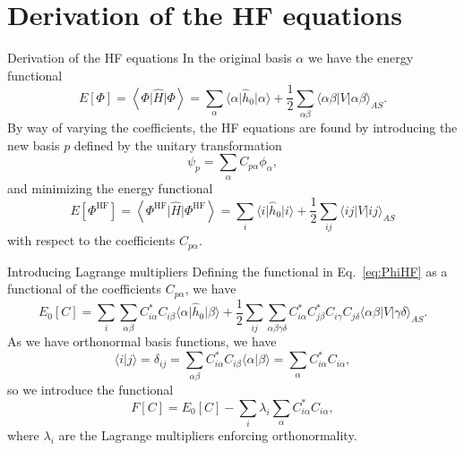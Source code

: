 \documentclass[UKenglish,aspectratio=169]{beamer}
\begin{document}

\appendix
\section{Derivation of the HF equations}

\begin{frame}{Derivation of the HF equations}
    In the original basis $\alpha$ we have the energy functional
    \begin{equation}
        E[\Phi]
        = \left\langle \Phi \vert \hat{H} \vert \Phi \right\rangle
        = \sum_{\alpha} \langle \alpha \vert \hat{h}_0 \vert \alpha \rangle
        + \frac{1}{2} \sum_{\alpha\beta} \langle \alpha\beta \vert V
        \vert \alpha \beta \rangle_{AS}.
    \end{equation}
    By way of varying the coefficients, the HF equations are found by
    introducing the new basis $p$ defined by the unitary transformation
    \begin{equation}
        \psi_p = \sum_{\alpha} C_{p\alpha} \phi_\alpha,
    \end{equation}
    and minimizing the energy functional
    \begin{equation}\label{eq:PhiHF}
        E[\Phi^\mathrm{HF}]
        = \left\langle \Phi^\mathrm{HF} \vert \hat{H} \vert
        \Phi^\mathrm{HF} \right\rangle
        = \sum_{i} \langle i \vert \hat{h}_0 \vert i \rangle +
        \frac{1}{2} \sum_{ij} \langle ij \vert V \vert ij \rangle_{AS}
    \end{equation}
    with respect to the coefficients $C_{p\alpha}$.
\end{frame}

\begin{frame}{Introducing Lagrange multipliers}
    Defining the functional in Eq.~\eqref{eq:PhiHF} as a functional
    of the coefficients $C_{p\alpha}$, we have
    \begin{equation}%
        E_0[C]
        = \sum_{i} \sum_{\alpha\beta} {
            C_{i \alpha}^*
            C_{i \beta}
            \langle \alpha \vert \hat{h}_0 \vert \beta \rangle
        }
        + \frac{1}{2} \sum_{ij} \sum_{\alpha\beta\gamma\delta} {
            C_{i \alpha}^*
            C_{j \beta}^*
            C_{i \gamma}
            C_{j \delta}
            \langle \alpha\beta \vert V \vert \gamma\delta \rangle_{AS}
        }.
    \end{equation}
    As we have orthonormal basis functions, we have
    \begin{equation}
        \langle i \vert j \rangle
        = \delta_{ij}
        = \sum_{\alpha\beta} C_{i\alpha}^* C_{i\beta}
        \langle \alpha \vert \beta \rangle
        = \sum_{\alpha} C_{i\alpha}^* C_{i\alpha},
    \end{equation}
    so we introduce the functional
    \begin{equation}
        F[C] = E_0[C] - \sum_{i} \lambda_i \sum_{\alpha}
        C_{i\alpha}^* C_{i\alpha},
    \end{equation}
    where $\lambda_i$ are the Lagrange multipliers enforcing orthonormality.
\end{frame}
\end{document}
